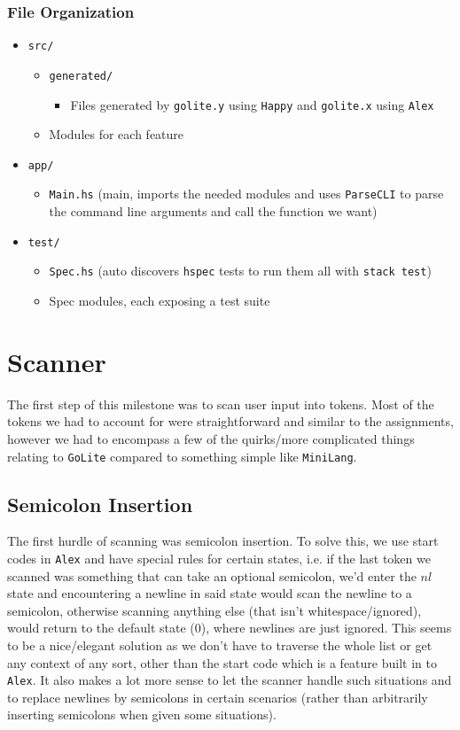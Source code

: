 \documentclass[11pt]{article}
\begin{document}
\subsubsection{File Organization}
\label{sec:org3a1ae13}
\begin{itemize}
\item \texttt{src/}
\begin{itemize}
\item \texttt{generated/}
\begin{itemize}
\item Files generated by \texttt{golite.y} using \texttt{Happy} and \texttt{golite.x} using \texttt{Alex}
\end{itemize}
\item Modules for each feature
\end{itemize}
\item \texttt{app/}
\begin{itemize}
\item \texttt{Main.hs} (main, imports the needed modules and uses
\texttt{ParseCLI} to parse the command line arguments and call the
function we want)
\end{itemize}
\item \texttt{test/}
\begin{itemize}
\item \texttt{Spec.hs} (auto discovers \texttt{hspec} tests to run them all with
\texttt{stack test})
\item Spec modules, each exposing a test suite
\end{itemize}
\end{itemize}
\section{Scanner}
\label{sec:org85caafd}
The first step of this milestone was to scan user input into
tokens. Most of the tokens we had to account for were straightforward
and similar to the assignments, however we had to encompass a few of
the quirks/more complicated things relating to \texttt{GoLite} compared to
something simple like \texttt{MiniLang}.
\subsection{Semicolon Insertion}
\label{sec:orge6eaed1}
The first hurdle of scanning was semicolon insertion. To solve
this, we use start codes in \texttt{Alex} and have special rules for
certain states, i.e. if the last token we scanned was something
that can take an optional semicolon, we'd enter the \(nl\) state and
encountering a newline in said state would scan the newline to a
semicolon, otherwise scanning anything else (that isn't
whitespace/ignored), would return to the default state (\(0\)), where
newlines are just ignored. This seems to be a nice/elegant solution
as we don't have to traverse the whole list or get any context of
any sort, other than the start code which is a feature built in to
\texttt{Alex}. It also makes a lot more sense to let the scanner handle
such situations and to replace newlines by semicolons in certain
scenarios (rather than arbitrarily inserting semicolons when given
some situations).
\end{document}
